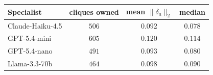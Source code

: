 \begin{tabular}{@{}lccc@{}}
\toprule
Specialist            & cliques owned & mean $\|\delta_a\|_2$ & median \\
\midrule
Claude-Haiku-4.5      & $506$         & $0.092$               & $0.078$ \\
GPT-5.4-mini          & $605$         & $0.120$               & $0.114$ \\
GPT-5.4-nano          & $491$         & $0.093$               & $0.080$ \\
Llama-3.3-70b         & $464$         & $0.098$               & $0.090$ \\
\bottomrule
\end{tabular}
